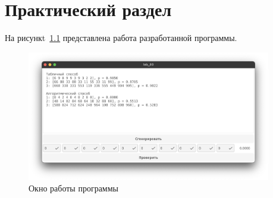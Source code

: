 \chapter{Практический раздел}

На рисункt~\ref{fig:1} представлена работа разработанной программы.

\begin{figure}[ht]
    \centering
    \includegraphics[width=0.95\textwidth]{assets/1.jpeg}
    \caption{Окно работы программы}
    \label{fig:1}
\end{figure}
